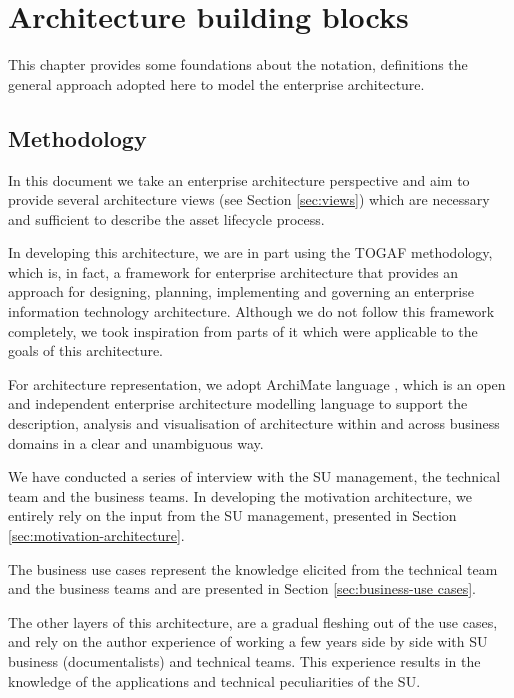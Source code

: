 \chapter{Architecture building blocks}
\label{sec:building-blocks}

	This chapter provides some foundations about the notation, definitions the general approach adopted here to model the enterprise architecture.

	\section{Methodology}
	
	In this document we take an enterprise architecture perspective and aim to provide several architecture views (see Section \ref{sec:views}) which are necessary and sufficient to describe the asset lifecycle process. 
	
	In developing this architecture, we are in part using the TOGAF \citep{togaf9.2} methodology, which is, in fact, a framework for enterprise architecture that provides an approach for designing, planning, implementing and governing an enterprise information technology architecture. Although we do not follow this framework completely, we took inspiration from parts of it which were applicable to the goals of this architecture.  
	
	For architecture representation, we adopt ArchiMate language \citep{archimate3.1}, which is an open and independent enterprise architecture modelling language to support the description, analysis and visualisation of architecture within and across business domains in a clear and unambiguous way.

	We have conducted a series of interview with the SU management, the technical team and the business teams. In developing the motivation architecture, we entirely rely on the input from the SU management, presented in Section \ref{sec:motivation-architecture}.
	
	 The business use cases represent the knowledge elicited from the technical team and the business teams and are presented in Section \ref{sec:business-use cases}. 
	 
	 The other layers of this architecture, are a gradual fleshing out of the use cases, and rely on the author experience of working a few years side by side with SU business (documentalists) and technical teams. This experience results in the knowledge of the applications and technical peculiarities of the SU. 
	 
